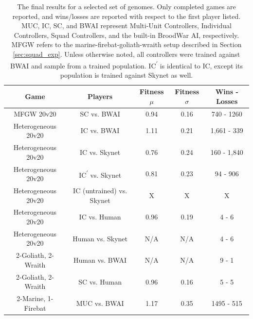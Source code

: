 \documentclass[10pt,a4paper,twocolumn]{article}
\newcommand{\fillin}[1]{X}
\begin{document}
\begin{table}
\centering
\begin{tabular}{|c|c|c|c|c|}
	\hline
	{\bf Game} & {\bf Players } & {\bf Fitness $\mu$} & {\bf Fitness $\sigma$} & {\bf Wins - Losses } \\ \hline
	MFGW 20v20 & SC vs. BWAI & 0.94 & 0.16 & 740 - 1260 \\ \hline
	Heterogeneous 20v20 & IC vs. BWAI & 1.11 & 0.21 & 1,661 - 339\\ \hline
	Heterogeneous 20v20 & IC vs. Skynet & 0.76 & 0.24 &  160 - 1,840 \\ \hline
	Heterogeneous 20v20 & IC\textsuperscript{$\prime$} vs. Skynet & 0.81 & 0.23 & 94 - 906 \\ \hline
	Heterogeneous 20v20 & IC (untrained) vs. Skynet & \fillin{mean} & \fillin{stddev} & \fillin{results} \\ \hline
	Heterogeneous 20v20 & IC vs. Human & 0.96 & 0.19 & 4 - 6 \\ \hline
	Heterogeneous 20v20 & Human vs. Skynet & N/A & N/A & 4 - 6 \\ \hline
	2-Goliath, 2-Wraith & Human vs. BWAI & N/A & N/A & 9 - 1\\ \hline
	2-Goliath, 2-Wraith & SC vs. Human & 0.96 & 0.16 & 5 - 5 \\ \hline
	2-Marine, 1-Firebat & MUC vs. BWAI & 1.17 & 0.35 & 1495 - 515 \\ \hline
\end{tabular}
\caption{The final results for a selected set of genomes. Only completed games are reported, and wins/losses are reported with respect to the first player listed. MUC, IC, SC, and BWAI represent Multi-Unit Controllers, Individual Controllers, Squad Controllers, and the built-in BroodWar AI, respectively. MFGW refers to the marine-firebat-goliath-wraith setup described in Section \ref{sec:squad_exp}. Unless otherwise noted, all controllers were trained against BWAI and sample from a trained population. IC\textsuperscript{$\prime$} is identical to IC, except its population is trained against Skynet as well.}
\label{tab:results}
\end{table}
\end{document}
